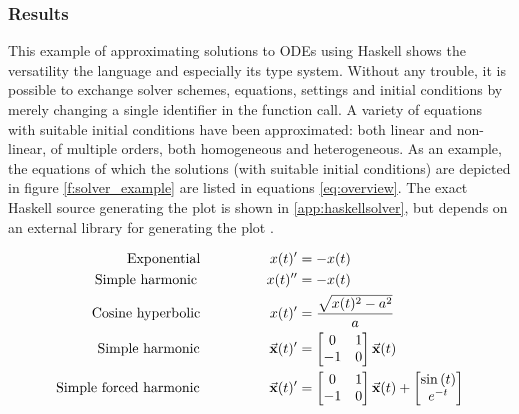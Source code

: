 \subsubsection{Results}
This example of approximating solutions to ODEs using Haskell shows the versatility the language and especially its type system. Without any trouble, it is possible to exchange solver schemes, equations, settings and initial conditions by merely changing a single identifier in the function call. A variety of equations with suitable initial conditions have been approximated: both linear and non-linear, of multiple orders, both homogeneous and heterogeneous. As an example, the equations of which the solutions (with suitable initial conditions) are depicted in figure \ref{f:solver_example} are listed in equations \ref{eq:overview}. The exact Haskell source generating the plot is shown in \ref{app:haskellsolver}, but depends on an external library for generating the plot \cite{HaskellChart}.

\begin{align}
	\label{eq:overview}	
	\text{Exponential}\hspace{50pt}{}			x(t)' &= -x(t)  \nonumber \\
	\text{Simple harmonic}\hspace{50pt}{}		x(t)'' &= -x(t) \nonumber \\
	\text{Cosine hyperbolic}\hspace{50pt}{}		x(t)' &= \frac{\sqrt{x(t)^{2} - a^{2}}}{a} \\
	\text{Simple harmonic}\hspace{50pt}{}		\vec{\mathbf{x}}(t)' &= \begin{bmatrix} 0 & 1 \\ -1 & 0 \\ \end{bmatrix}\vec{\mathbf{x}}(t) \nonumber \\
	\text{Simple forced harmonic}\hspace{50pt}{}	\vec{\mathbf{x}}(t)' &= \begin{bmatrix} 0 & 1 \\ -1 & 0 \\ \end{bmatrix}\vec{\mathbf{x}}(t) + \begin{bmatrix} \sin{(t)} \\ e^{-t} \\ \end{bmatrix} \nonumber
\end{align}

